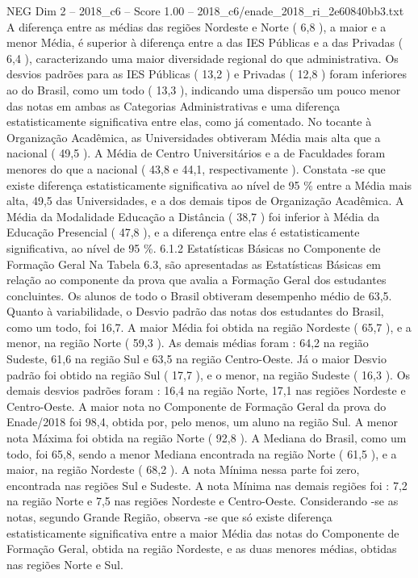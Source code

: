 \begin{textsample}{NEG Dim 2 – 2018\_c6 – Score 1.00 – 2018\_c6/enade\_2018\_ri\_2e60840bb3.txt}
A diferença entre as médias das regiões Nordeste e Norte ( 6,8 ), a maior e a menor Média, é superior à diferença entre a das IES Públicas e a das Privadas ( 6,4 ), caracterizando uma maior diversidade regional do que administrativa.
Os desvios padrões para as IES Públicas ( 13,2 ) e Privadas ( 12,8 ) foram inferiores ao do Brasil, como um todo ( 13,3 ), indicando uma dispersão um pouco menor das notas em ambas as Categorias Administrativas e uma diferença estatisticamente significativa entre elas, como já comentado.
No tocante à Organização Acadêmica, as Universidades obtiveram Média mais alta que a nacional ( 49,5 ).
A Média de Centro Universitários e a de Faculdades foram menores do que a nacional ( 43,8 e 44,1, respectivamente ).
Constata -se que existe diferença estatisticamente significativa ao nível de 95 \% entre a Média mais alta, 49,5 das Universidades, e a dos demais tipos de Organização Acadêmica.
A Média da Modalidade Educação a Distância ( 38,7 ) foi inferior à Média da Educação Presencial ( 47,8 ), e a diferença entre elas é estatisticamente significativa, ao nível de 95 \%. 6.1.2 Estatísticas Básicas no Componente de Formação Geral Na Tabela 6.3, são apresentadas as Estatísticas Básicas em relação ao componente da prova que avalia a Formação Geral dos estudantes concluintes.
Os alunos de todo o Brasil obtiveram desempenho médio de 63,5.
Quanto à variabilidade, o Desvio padrão das notas dos estudantes do Brasil, como um todo, foi 16,7.
A maior Média foi obtida na região Nordeste ( 65,7 ), e a menor, na região Norte ( 59,3 ).
As demais médias foram : 64,2 na região Sudeste, 61,6 na região Sul e 63,5 na região Centro-Oeste.
Já o maior Desvio padrão foi obtido na região Sul ( 17,7 ), e o menor, na região Sudeste ( 16,3 ).
Os demais desvios padrões foram : 16,4 na região Norte, 17,1 nas regiões Nordeste e Centro-Oeste.
A maior nota no Componente de Formação Geral da prova do Enade/2018 foi 98,4, obtida por, pelo menos, um aluno na região Sul.
A menor nota Máxima foi obtida na região Norte ( 92,8 ).
A Mediana do Brasil, como um todo, foi 65,8, sendo a menor Mediana encontrada na região Norte ( 61,5 ), e a maior, na região Nordeste ( 68,2 ).
A nota Mínima nessa parte foi zero, encontrada nas regiões Sul e Sudeste.
A nota Mínima nas demais regiões foi : 7,2 na região Norte e 7,5 nas regiões Nordeste e Centro-Oeste.
Considerando -se as notas, segundo Grande Região, observa -se que só existe diferença estatisticamente significativa entre a maior Média das notas do Componente de Formação Geral, obtida na região Nordeste, e as duas menores médias, obtidas nas regiões Norte e Sul.

\end{textsample}
